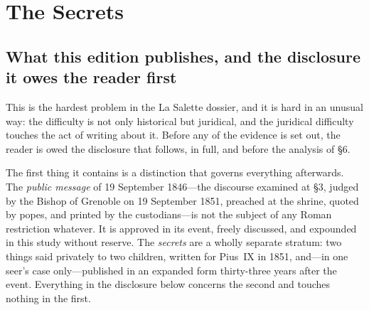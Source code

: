 \section{The Secrets}

\subsection{What this edition publishes, and the disclosure it owes
the reader first}

This is the hardest problem in the La Salette dossier, and it is
hard in an unusual way: the difficulty is not only historical but
juridical, and the juridical difficulty touches the act of writing
about it. Before any of the evidence is set out, the reader is owed
the disclosure that follows, in full, and before the analysis of
\S6.

The first thing it contains is a distinction that governs everything
afterwards. The \emph{public message} of 19 September 1846---the
discourse examined at \S3, judged by the Bishop of Grenoble on 19
September 1851, preached at the shrine, quoted by popes, and printed
by the custodians---is not the subject of any Roman restriction
whatever. It is approved in its event, freely discussed, and
expounded in this study without reserve. The \emph{secrets} are a
wholly separate stratum: two things said privately to two children,
written for Pius~IX in 1851, and---in one seer's case
only---published in an expanded form thirty-three years after the
event. Everything in the disclosure below concerns the second and
touches nothing in the first.

